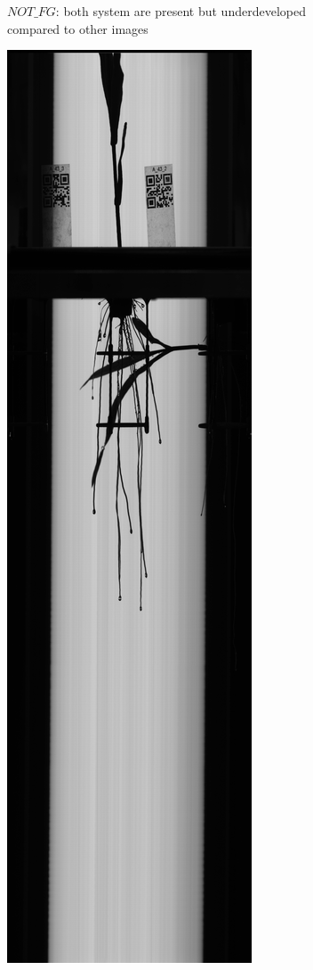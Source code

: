 \begin{figure}
\begin{subfigure}[t]{.13\textwidth}
  \caption{$NOT\_FG$: both system are present but underdeveloped compared to other images }
  \label{fig:NOT_FG}
\end{subfigure}
%
\begin{subfigure}[t]{.13\textwidth}
  \centering
  \includegraphics[width=\linewidth]{figures/OVERLAP.jpg}

\end{subfigure}
\end{figure}
